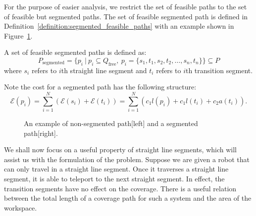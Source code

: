 \documentclass[../main.tex]{subfiles}
\begin{document}
For the purpose of easier analysis, we restrict the set of feasible paths to the set of feasible but segmented paths. The set of feasible segmented path is defined in Definition~\ref{definition:segmented_feasible_paths} with an example shown in Figure~\ref{fig:nonsegmented_vs_segmented}.
\begin{definition}
\label{definition:segmented_feasible_paths}
A set of feasible segmented paths is defined as:
	\begin{equation}
		P_{\text{segmented}}=\{p_i\ |\ p_i\subseteq Q_{\text{free}},\  p_i=\{s_1,t_1,s_2,t_2,\dots,s_n,t_n\}\}\subseteq P
	\end{equation}
	where $s_i$ refers to $i$th straight line segment and $t_i$ refers to $i$th transition segment.
\end{definition}

Note the cost for a segmented path has the following structure:
\begin{equation}
	\label{eq:segmented_cost}
	\mathcal{E}(p_i)=\sum_{i=1}^N(\mathcal{E}(s_i)+\mathcal{E}(t_i))=\sum_{i=1}^N(c_1l(p_i)+c_1l(t_i)+c_2a(t_i)).
\end{equation}

\begin{figure}
	\centering
	\begin{subfigure}{0.5\linewidth}
		\centering
		
	\end{subfigure}%
	\begin{subfigure}{0.5\linewidth}
		\centering
		
	\end{subfigure}
	\caption{An example of non-segmented path[left] and a segmented path[right].}
	\label{fig:nonsegmented_vs_segmented}
\end{figure}

We shall now focus on a useful property of straight line segments, which will assist us with the formulation of the problem. %
Suppose we are given a robot that can only travel in a straight line segment. Once it traverses a straight line segment, it is able to teleport to the next straight segment. In effect, the transition segments have no effect on the coverage. There is a useful relation between the total length of a coverage path for such a system and the area of the workspace.
\end{document}

